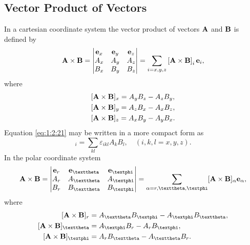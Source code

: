 \subsection{Vector Product of Vectors}\label{sec:1.2.3}
In a cartesian coordinate system the vector product of vectors \(\mathbf{A}\) and \(\mathbf{B}\) is defined by
\begin{equation}
\mathbf{A} \times \mathbf{B}=\begin{vmatrix}
\mathbf{e}_{x} & \mathbf{e}_{y} & \mathbf{e}_{z}  \label{eq:1:2:20}\\
A_{x} & A_{y} & A_{z} \\
B_{x} & B_{y} & B_{z}
\end{vmatrix}=\sum_{i=x, y, z}\left[\mathbf{A} \times \mathbf{B}\right]_{i} \mathbf{e}_{i},
\end{equation}
where
\begin{align}
& {[\mathbf{A} \times \mathbf{B}]_{x}=A_{y} B_{z}-A_{z} B_{y}} , \notag\\
& {[\mathbf{A} \times \mathbf{B}]_{y}=A_{z} B_{x}-A_{x} B_{z}} , \label{eq:1:2:21}\\
& {[\mathbf{A} \times \mathbf{B}]_{z}=A_{x} B_{y}-A_{y} B_{x}} .\notag
\end{align}
Equation \eqref{eq:1:2:21} may be written in a more compact form as
\begin{equation}
[\vect{A} \times \vect{B}]_{i}=\sum_{k l} \varepsilon_{i k l} A_{k} B_{l}, \quad(i, k, l=x, y, z). \label{eq:1:2:22}
\end{equation}
In the polar coordinate system
\begin{equation}
\vect{A} \times \vect{B}=\begin{vmatrix}
\vect{e}_{r} & \vect{e}_{\vartheta} & \vect{e}_{\varphi}  \label{eq:1:2:23}\\
A_{r} & A_{\vartheta} & A_{\varphi} \\
B_{r} & B_{\vartheta} & B_{\varphi}
\end{vmatrix}=\sum_{\alpha=r, \vartheta, \varphi}[\vect{A} \times \vect{B}]_{\alpha} \vect{e}_{\alpha},
\end{equation}
where
\begin{align}
{[\vect{A} \times \vect{B}]_{r} } & =A_{\vartheta} B_{\varphi}-A_{\varphi} B_{\vartheta} , \notag\\
{[\vect{A} \times \vect{B}]_{\vartheta} } & =A_{\varphi} B_{r}-A_{r} B_{\varphi} , \label{eq:1:2:24}\\
{[\vect{A} \times \vect{B}]_{\varphi} } & =A_{r} B_{\vartheta}-A_{\vartheta} B_{r} \notag .
\end{align}
